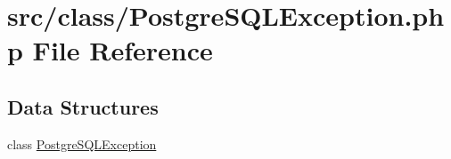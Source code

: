 \hypertarget{_postgre_s_q_l_exception_8php}{}\section{src/class/\+Postgre\+S\+Q\+L\+Exception.php File Reference}
\label{_postgre_s_q_l_exception_8php}
\subsection*{Data Structures}
\begin{DoxyCompactItemize}
\item 
class \hyperlink{class_postgre_s_q_l_exception}{Postgre\+S\+Q\+L\+Exception}
\end{DoxyCompactItemize}
